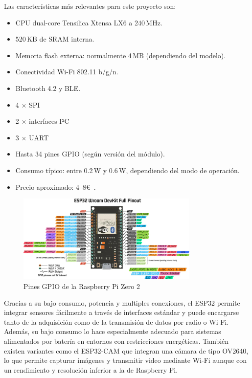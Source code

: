 \begin{itemize}
    Las características más relevantes para este proyecto son:
    \begin{itemize}
        \item CPU dual-core Tensilica Xtensa LX6 a 240\,MHz.
        \item 520\,KB de SRAM interna.
        \item Memoria flash externa: normalmente 4\,MB (dependiendo del modelo).
        \item Conectividad Wi-Fi 802.11 b/g/n.
        \item Bluetooth 4.2 y BLE.
        \item 4 × SPI
        \item 2 × interfaces I²C
        \item 3 × UART
        \item Hasta 34 pines GPIO (según versión del módulo).
        \item Consumo típico: entre 0.2\,W y 0.6\,W, dependiendo del modo de operación.
        \item Precio aproximado: 4–8€~\cite{esp32}.
    \end{itemize}
    \begin{figure}[h]
        \centering
        \includegraphics[width=0.8\textwidth]{Imagenes/Bitmap/esp32gpio}
        \caption{Pines GPIO de la Raspberry Pi Zero 2}
        \label{fig:esp32gpio}
    \end{figure}

    Gracias a su bajo consumo, potencia y multiples conexiones, el ESP32 permite integrar sensores fácilmente a través de interfaces estándar y puede encargarse tanto de la adquisición como de la transmisión de datos por radio o Wi-Fi.
    Además, su bajo consumo lo hace especialmente adecuado para sistemas alimentados por batería en entornos con restricciones energéticas.
    También existen variantes como el ESP32-CAM que integran una cámara de tipo OV2640, lo que permite capturar imágenes y transmitir video mediante Wi-Fi
    aunque con un rendimiento y resolución inferior a la de Raspberry Pi.


\end{itemize}

